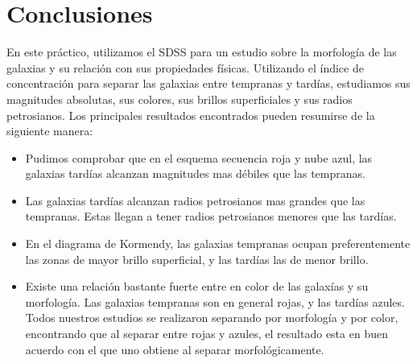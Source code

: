 \documentclass[a4paper,10pt]{article}
\def\aj {AJ}
\def\mnras {MNRAS}
\begin{document}
\section{Conclusiones}

En este pr\'actico, utilizamos el SDSS para un estudio sobre la morfolog\'ia de las galaxias y su relaci\'on con sus propiedades f\'isicas. Utilizando el \'indice de concentraci\'on para separar las galaxias entre tempranas y tard\'ias, estudiamos sus magnitudes absolutas, sus colores, sus brillos superficiales y sus radios petrosianos. 
Los principales resultados encontrados pueden resumirse de la siguiente manera:
\begin{itemize}
  \item Pudimos comprobar que en el esquema secuencia roja y nube azul, las galaxias tard\'ias alcanzan magnitudes mas d\'ebiles que las tempranas. 
 \item Las galaxias tard\'ias alcanzan radios petrosianos mas grandes que las tempranas. Estas llegan a tener radios petrosianos menores que las tard\'ias. 
 \item En el diagrama de Kormendy, las galaxias tempranas ocupan preferentemente las zonas de mayor brillo superficial, y las tard\'ias las de menor brillo.
 \item Existe una relaci\'on bastante fuerte entre en color de las galax\'ias y su morfolog\'ia. Las galaxias tempranas son en general rojas, y las tard\'ias azules. Todos nuestros estudios se realizaron separando por morfolog\'ia y por color, encontrando que al separar entre rojas y azules, el resultado esta en buen acuerdo con el que uno obtiene al separar morfol\'ogicamente. 
\end{itemize}


















\end{document}
